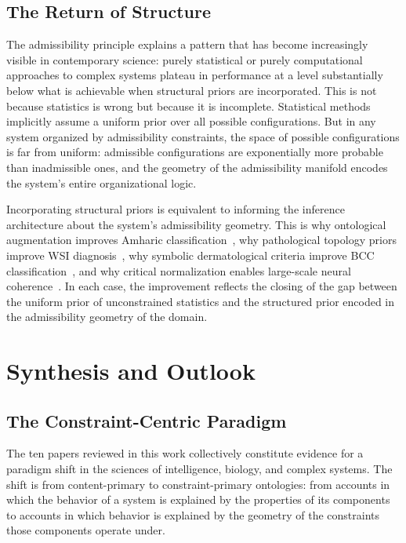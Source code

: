 \documentclass[11pt, oneside]{article}
\numberwithin{equation}{section}
\theoremstyle{rsvpstyle}
\theoremstyle{remark}
\begin{document}
\subsection{The Return of Structure}

The admissibility principle explains a pattern that has become increasingly visible in
contemporary science: purely statistical or purely computational approaches to complex
systems plateau in performance at a level substantially below what is achievable when
structural priors are incorporated. This is not because statistics is wrong but because
it is incomplete. Statistical methods implicitly assume a uniform prior over all possible
configurations. But in any system organized by admissibility constraints, the space of
possible configurations is far from uniform: admissible configurations are exponentially
more probable than inadmissible ones, and the geometry of the admissibility manifold
encodes the system's entire organizational logic.

Incorporating structural priors is equivalent to informing the inference architecture
about the system's admissibility geometry. This is why ontological augmentation improves
Amharic classification~\cite{Taye2026Amharic}, why pathological topology priors improve
WSI diagnosis~\cite{Wu2026GNN}, why symbolic dermatological criteria improve BCC
classification~\cite{Matas2026BCC}, and why critical normalization enables large-scale
neural coherence~\cite{Pachitariu2026Critical}. In each case, the improvement reflects
the closing of the gap between the uniform prior of unconstrained statistics and the
structured prior encoded in the admissibility geometry of the domain.

\section{Synthesis and Outlook}

\subsection{The Constraint-Centric Paradigm}

The ten papers reviewed in this work collectively constitute evidence for a paradigm
shift in the sciences of intelligence, biology, and complex systems. The shift is from
content-primary to constraint-primary ontologies: from accounts in which the behavior
of a system is explained by the properties of its components to accounts in which
behavior is explained by the geometry of the constraints those components operate under.
\end{document}
